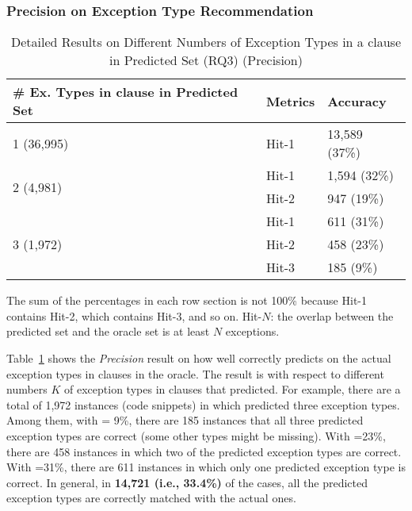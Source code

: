 
\subsubsection{{\bf Precision on Exception Type Recommendation}}
\label{sec:req3-precision}


\begin{table}[t]
  \caption{Detailed Results on Different Numbers of Exception Types in a  clause in Predicted Set (RQ3) (Precision)}
	\vspace{-12pt}
	{\small
		\begin{center}
			\renewcommand{\arraystretch}{1}
			\begin{tabular}{p{5cm}<{\centering}|p{1cm}<{\centering}|p{1.5cm}<{\centering}}
				\hline
				\# Ex. Types in \code{catch} clause in Predicted Set & Metrics & Accuracy \\
				\hline
				\multirow{1}{*}{1 (36,995)}   & Hit-1  & 13,589 (37\%) \\
				\hline
				\multirow{2}{*}{2 (4,981)}  & Hit-1   & 1,594 (32\%) \\
				& Hit-2       						& 947 (19\%) \\
				\hline
				\multirow{3}{*}{3 (1,972)}  & Hit-1    & 611 (31\%) \\
				& Hit-2         					& 458 (23\%)\\
				& Hit-3         				  	& 185 (9\%) \\
				\hline
			\end{tabular}
                        The sum of the percentages in each row section is not 100\% because Hit-1 contains Hit-2, which contains Hit-3, and so on. Hit-$N$: the overlap between the predicted set and the oracle set is at least $N$ exceptions.
			\label{tab:precision-3}
		\end{center}
	}
\end{table}

Table~\ref{tab:precision-3} shows the {\em Precision} result on how
well {\tool} correctly predicts on the actual exception types in
 clauses in the oracle. The result is with respect to
different numbers $K$ of exception types in  clauses that
{\tool} predicted. For example, there are a total of 1,972 instances
(code snippets) in which {\tool} predicted three exception types.
Among them, with  = 9\%, there are 185 instances that all
three predicted exception types are correct (some other types might be
missing). With =23\%, there are 458 instances in which two
of the predicted exception types are correct. With =31\%,
there are 611 instances in which only one predicted exception type is
correct. In general, in {\bf 14,721 (i.e., 33.4\%)} of the cases, all
the predicted exception types are correctly matched with the actual
ones.


